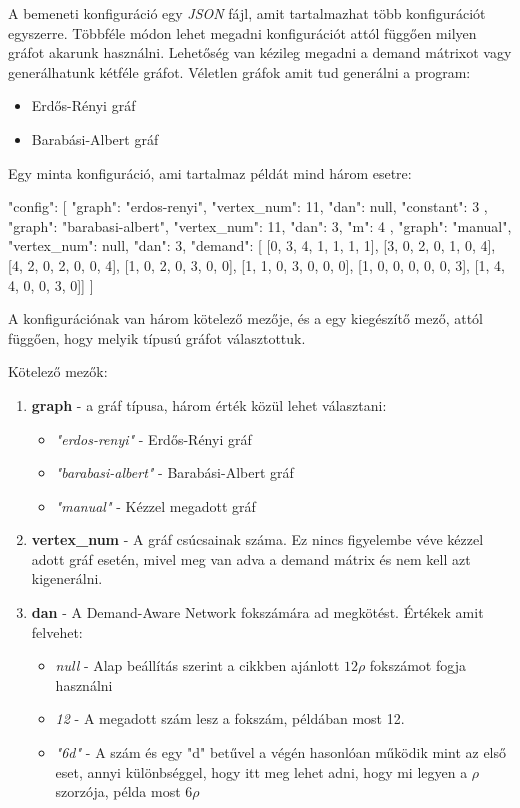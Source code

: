 \documentclass[12pt]{report}
\begin{document}
A bemeneti konfiguráció egy \textit{JSON} fájl, amit tartalmazhat több konfigurációt egyszerre.
Többféle módon lehet megadni konfigurációt attól függően milyen gráfot akarunk használni. 
Lehetőség van kézileg megadni a demand mátrixot vagy generálhatunk kétféle gráfot.
Véletlen gráfok amit tud generálni a program:
\begin{itemize}
	\item Erdős-Rényi gráf
	\item Barabási-Albert gráf
\end{itemize}

Egy minta konfiguráció, ami tartalmaz példát mind három esetre:

\begin{mintedJson}
{
  "config": [ {
	"graph": "erdos-renyi",
	"vertex_num": 11,
	"dan": null,
	"constant": 3
  }, {
	"graph": "barabasi-albert",
	"vertex_num": 11,
	"dan": 3,
	"m": 4
  }, {
	"graph": "manual",
	"vertex_num": null,
	"dan": 3,
	"demand": [
		[0, 3, 4, 1, 1, 1, 1],
		[3, 0, 2, 0, 1, 0, 4],
		[4, 2, 0, 2, 0, 0, 4],
		[1, 0, 2, 0, 3, 0, 0],
		[1, 1, 0, 3, 0, 0, 0],
		[1, 0, 0, 0, 0, 0, 3],
		[1, 4, 4, 0, 0, 3, 0]]	
	} ]
}
\end{mintedJson}

A konfigurációnak van három kötelező mezője, és a egy kiegészítő mező, attól függően, hogy melyik típusú gráfot választottuk. 

Kötelező mezők: 
\begin{enumerate}
	\item \textbf{graph} - a gráf típusa, három érték közül lehet választani:
	\begin{itemize}
		\item \textit{"erdos-renyi"} - Erdős-Rényi gráf 
		\item \textit{"barabasi-albert"} - Barabási-Albert gráf
		\item \textit{"manual"} - Kézzel megadott gráf
	\end{itemize}
	\item \textbf{vertex\_num} - A gráf csúcsainak száma. Ez nincs figyelembe véve kézzel adott gráf esetén, mivel meg van adva a demand mátrix és nem kell azt kigenerálni.
	\item \textbf{dan} - A Demand-Aware Network fokszámára ad megkötést. Értékek amit felvehet:
	\begin{itemize}
		\item \textit{null} - Alap beállítás szerint a cikkben ajánlott $12\rho$ fokszámot fogja használni
		\item \textit{12} - A megadott szám lesz a fokszám, példában most 12.
		\item \textit{"6d"} - A szám és egy "d" betűvel a végén hasonlóan működik mint az első eset, annyi különbséggel, hogy itt meg lehet adni, hogy mi legyen a $\rho$ szorzója, példa most $6\rho$
	\end{itemize}
\end{enumerate}
\end{document}
